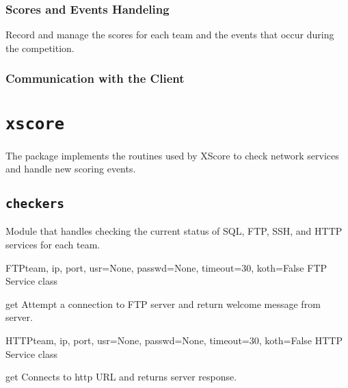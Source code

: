 \documentclass[letterpaper,10pt,english]{manual}
\begin{document}
\subsection{Scores and Events Handeling}

Record and manage the scores for each team and the events that occur during the competition.


\subsection{Communication with the Client}

\resetcurrentobjects
\hypertarget{--doc-xscore}{}

\chapter{\texttt{xscore}}

The  package implements the routines used by XScore to check
network services and handle new scoring events.


\section{\texttt{checkers}}
\hypertarget{module-xscore.checkers}{}
\modulesynopsis{}
Module that handles checking the current status of SQL, FTP,
SSH, and HTTP services for each team.

\hypertarget{xscore.checkers.FTP}{}\begin{classdesc}{FTP}{team, ip, port, usr=None, passwd=None, timeout=30, koth=False}
FTP Service class

\hypertarget{xscore.checkers.FTP.get}{}\begin{methoddesc}{get}{}
Attempt a connection to FTP server and return welcome message from server.
\end{methoddesc}
\end{classdesc}

\hypertarget{xscore.checkers.HTTP}{}\begin{classdesc}{HTTP}{team, ip, port, usr=None, passwd=None, timeout=30, koth=False}
HTTP Service class

\hypertarget{xscore.checkers.HTTP.get}{}\begin{methoddesc}{get}{}
Connects to http URL and returns server response.
\end{methoddesc}
\end{classdesc}
\end{document}
